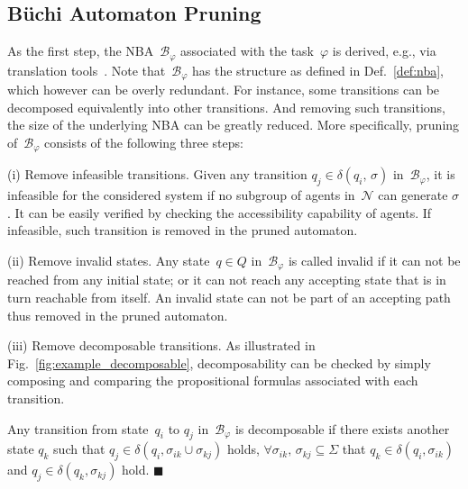 \subsection{B\"{u}chi Automaton Pruning}
\label{subsubsec:NBA-pruning}
As the first step, the NBA~$\mathcal{B}_{\varphi}$ associated with the task~$\varphi$
is derived, e.g., via translation tools~\cite{gastin2001fast}.
Note that~$\mathcal{B}_{\varphi}$ has the structure as defined in Def.~\ref{def:nba},
which however can be overly redundant.
For instance, some transitions can be decomposed equivalently
into other transitions. And removing such transitions, the size of the underlying NBA
can be greatly reduced.
More specifically, pruning of~$\mathcal{B}_{\varphi}$ consists of the following three steps:

(i) Remove infeasible transitions.
Given any transition $q_j \in \delta(q_i,\, \sigma)$ in~$\mathcal{B}_{\varphi}$,
it is infeasible for the considered system if
no subgroup of agents in~$\mathcal{N}$ can generate $\sigma$.
It can be easily verified by checking the accessibility capability of agents.
If infeasible, such transition is removed in the pruned automaton.

(ii) Remove invalid states.
Any state~$q\in Q$ in~$\mathcal{B}_{\varphi}$ is called invalid
if it can not be reached from any initial state;
or it can not reach any accepting state that is in turn reachable from itself.
An invalid state can not be part of an accepting path thus removed in the pruned automaton.

(iii) Remove decomposable transitions.
As illustrated in Fig.~\ref{fig:example_decomposable},
 decomposability can be checked by simply composing and comparing the
propositional formulas associated with each transition.

\begin{definition}\label{def:decomposable-transition}
Any transition from state~$q_i$ to $q_j$ in~$\mathcal{B}_{\varphi}$ is decomposable if there exists another state $q_k$ such that $q_j\in \delta(q_i,\sigma_{ik}\cup\sigma_{kj})$ holds,
$\forall \sigma_{ik},\,\sigma_{kj} \subseteq \Sigma$ that $q_k\in \delta(q_i,\sigma_{ik})$ and $q_j\in \delta(q_k,\sigma_{kj})$ hold.
\hfill $\blacksquare$
\end{definition}

